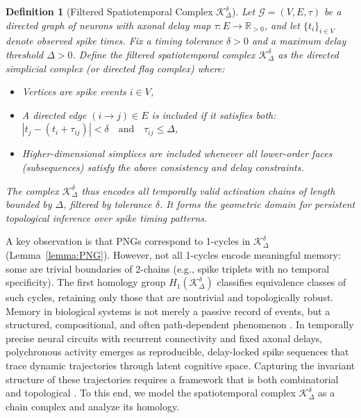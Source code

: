\documentclass[lettersize,journal]{IEEEtran}
\newtheorem{definition}{Definition}
\begin{document}
\begin{definition}[Filtered Spatiotemporal Complex \( \mathcal{K}_\Delta^\delta \)]
Let \( \mathcal{G} = (V, E, \tau) \) be a directed graph of neurons with axonal delay map \( \tau: E \to \mathbb{R}_{>0} \), and let \( \{t_i\}_{i \in V} \) denote observed spike times. Fix a timing tolerance \( \delta > 0 \) and a maximum delay threshold \( \Delta > 0 \).
Define the \emph{filtered spatiotemporal complex} \( \mathcal{K}_\Delta^\delta \) as the directed simplicial complex (or directed flag complex) where:
\begin{itemize}
    \item Vertices are spike events \( i \in V \),
    \item A directed edge \( (i \to j) \in E \) is included if it satisfies both:
   $ |t_j - (t_i + \tau_{ij})| < \delta \quad \text{and} \quad \tau_{ij} \leq \Delta$,
    \item Higher-dimensional simplices are included whenever all lower-order faces (subsequences) satisfy the above consistency and delay constraints.
\end{itemize}
The complex \( \mathcal{K}_\Delta^\delta \) thus encodes all temporally valid activation chains of length bounded by \( \Delta \), filtered by tolerance \( \delta \). It forms the geometric domain for persistent topological inference over spike timing patterns.
\label{def:filtered_spatiotemporal_complex}
\end{definition}


A key observation is that PNGs correspond to 1-cycles in \( \mathcal{K}_\Delta^\delta \) (Lemma~\ref{lemma:PNG}). However, not all 1-cycles encode meaningful memory: some are trivial boundaries of 2-chains (e.g., spike triplets with no temporal specificity). The first homology group \( H_1(\mathcal{K}_\Delta^\delta) \) classifies equivalence classes of such cycles, retaining only those that are nontrivial and topologically robust. Memory in biological systems is not merely a passive record of events, but a structured, compositional, and often path-dependent phenomenon \cite{giusti2015clique}. In temporally precise neural circuits with recurrent connectivity and fixed axonal delays, polychronous activity emerges as reproducible, delay-locked spike sequences that trace dynamic trajectories through latent cognitive space. Capturing the invariant structure of these trajectories requires a framework that is both combinatorial and topological \cite{edelsbrunner2010computational}. To this end, we model the spatiotemporal complex \( \mathcal{K}_\Delta^\delta \) as a chain complex and analyze its homology.
\end{document}
